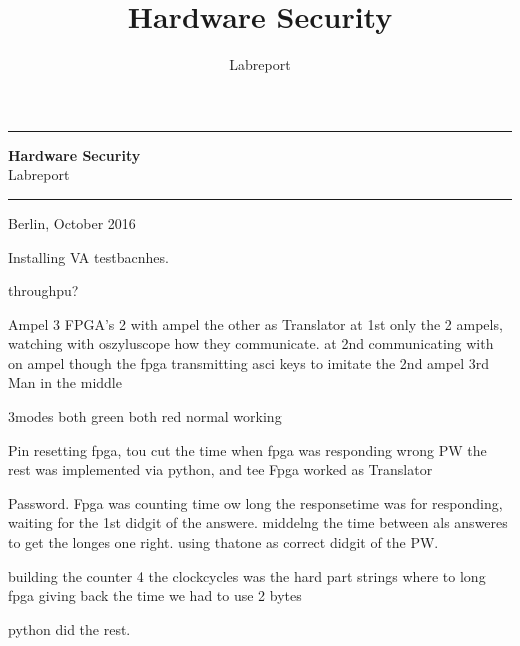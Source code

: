 \documentclass[a4paper, twoside, ngerman, 12pt]{scrartcl}
\title{Hardware Security}
\subtitle{Labreport}
\date{}
\begin{document}
    \begin{titlepage}
        \begin{figure*}
            \begin{flushright}
            \end{flushright}
        \end{figure*}
        \vspace*{-1cm}
        \hrule
        \vspace{.2cm}
        \begin{center}
            \vfill
            \textsf{\textbf{\Huge{Hardware Security}}}\\[1.5em]
            \textsf{\LARGE{Labreport}}
            \vfill
        \end{center}
        \vfill
        \hrule
        \vspace{.2cm}
        \large{Berlin, October 2016}
    \end{titlepage}
    
    \setcounter{page}{1}
    
    
    
    Installing VA testbacnhes.
    
    
    
    
    throughpu?
    
    

Ampel
3 FPGA's 2 with ampel the other as Translator 
at 1st only the 2 ampels, watching with oszyluscope how they communicate.
at 2nd communicating with on ampel though the fpga transmitting asci keys to imitate the 2nd ampel
3rd Man in the middle 

3modes both green
both red
normal working

    

Pin 
resetting fpga, tou cut the time when fpga was responding wrong PW
the rest was implemented via python, and tee Fpga worked as Translator

    

Password. Fpga was counting time ow long the responsetime was for responding, waiting for the 1st didgit of the answere. middelng the time between als answeres to get the longes one right. using thatone as correct didgit of the PW.

building the counter 4 the clockcycles was the hard part strings where to long
fpga giving back the time  we had to use 2 bytes
 
python did the rest.

    
\end{document}
